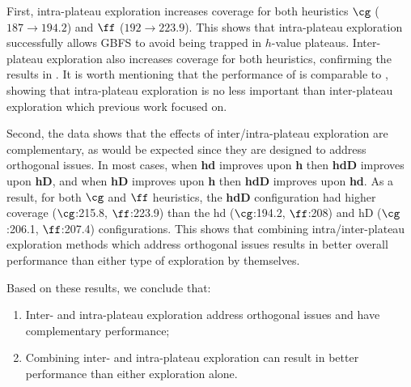 First, 
% 
intra-plateau exploration  increases coverage for both heuristics
$\cg$ ($187 \rightarrow 194.2$) and $\ff$ ($192 \rightarrow 223.9$).
This shows that intra-plateau exploration successfully allows GBFS to avoid being trapped in $h$-value plateaus.
Inter-plateau exploration  also increases coverage for both heuristics, confirming the results in \cite{xie14type}.
It is worth mentioning that the performance of  is comparable to , showing that intra-plateau exploration is no less important than inter-plateau exploration which previous work focused on.

Second, the data shows that the effects of inter/intra-plateau exploration are complementary, 
as would be expected since they are designed to address orthogonal issues.
In most cases,
when \textbf{hd} improves upon \textbf{h} then \textbf{hdD} improves upon \textbf{hD},
and when \textbf{hD} improves upon \textbf{h} then \textbf{hdD} improves upon \textbf{hd}.
As a result, for both $\cg$ and $\ff$ heuristics, the \textbf{hdD} configuration had higher coverage ($\cg$:215.8, $\ff$:223.9) than the hd ($\cg$:194.2, $\ff$:208) and hD ($\cg$:206.1, $\ff$:207.4) configurations. 
This shows that combining intra/inter-plateau exploration methods which address orthogonal issues results in better overall performance than either type of exploration by themselves.

% 



Based on these results, we conclude that:
\begin{enumerate} %
\item Inter- and intra-plateau exploration address orthogonal issues and have complementary performance; 
\item Combining inter- and intra-plateau exploration can result in better performance than either  exploration alone.
\end{enumerate}
